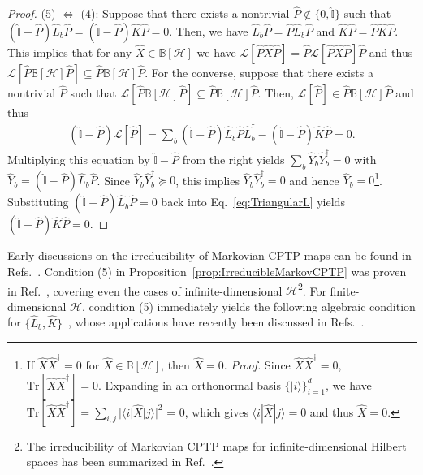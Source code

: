 \documentclass[preprint,pteplogo]{ptephy_v2}%
\numberwithin{equation}{section}
\theoremstyle{definition}
\newcommand{\mc}[1]{\mathcal{#1}}
\newcommand{\mr}[1]{\mathrm{#1}}
\newcommand{\mbb}[1]{\mathbb{#1}}
\newcommand{\Tr}{\mr{Tr}}
\begin{document}
\begin{proof}
(5) $\Leftrightarrow$ (4): 
Suppose that there exists a nontrivial $\hat{P} \notin \{ 0, \hat{\mathbb{I}} \}$ such that $(\hat{\mbb{I}}-\hat{P}) \hat{L}_b \hat{P} = (\hat{\mbb{I}}-\hat{P}) \hat{K} \hat{P} =0$.
Then, we have $\hat{L}_b \hat{P} = \hat{P} \hat{L}_b \hat{P}$ and $\hat{K} \hat{P} = \hat{P} \hat{K} \hat{P}$.
This implies that for any $\hat{X} \in \mbb{B}[\mc{H}]$ we have $\mc{L}[\hat{P} \hat{X} \hat{P}] = \hat{P} \mc{L}[\hat{P} \hat{X} \hat{P}] \hat{P}$ and thus $\mc{L}[\hat{P} \mbb{B}[\mc{H}] \hat{P}] \subseteq \hat{P} \mbb{B}[\mc{H}] \hat{P}$. 
For the converse, suppose that there exists a nontrivial $\hat{P}$ such that $\mc{L}[\hat{P} \mbb{B}[\mc{H}] \hat{P}] \subseteq \hat{P} \mbb{B}[\mc{H}] \hat{P}$. 
Then, $\mc{L}[\hat{P}] \in \hat{P} \mbb{B}[\mc{H}] \hat{P}$ and thus
\begin{align} \label{eq:TriangularL}
(\hat{\mbb{I}} -\hat{P}) \mc{L}[\hat{P}] = \sum_b (\hat{\mbb{I}}-\hat{P}) \hat{L}_b \hat{P} \hat{L}_b^\dagger -(\hat{\mbb{I}} -\hat{P}) \hat{K} \hat{P} = 0.
\end{align}
Multiplying this equation by $\hat{\mbb{I}} -\hat{P}$ from the right yields $\sum_b \hat{Y}_b \hat{Y}_b^\dagger = 0$ with $\hat{Y}_b = (\hat{\mbb{I}} -\hat{P}) \hat{L}_b \hat{P}$.
Since $\hat{Y}_b \hat{Y}_b^\dagger \succeq 0$, this implies $\hat{Y}_b \hat{Y}_b^\dagger = 0$ and hence $\hat{Y}_b = 0$\footnote{
If $\hat{X} \hat{X}^\dagger = 0$ for $\hat{X} \in \mbb{B}[\mc{H}]$, then $\hat{X}=0$. 
\textit{Proof.} Since $\hat{X} \hat{X}^\dagger = 0$, $\Tr [\hat{X} \hat{X}^\dagger] = 0$.
Expanding in an orthonormal basis $\{ |i\rangle \}_{i=1}^d$, we have $\Tr[\hat{X} \hat{X}^\dagger] = \sum_{i,j} |\langle i | \hat{X} | j \rangle|^2$ = 0, which gives $\langle i | \hat{X} | j \rangle = 0$ and thus $\hat{X}=0$.
}.
Substituting $(\hat{\mbb{I}}-\hat{P}) \hat{L}_b \hat{P} =0$ back into Eq.~\eqref{eq:TriangularL} yields $(\hat{\mbb{I}} -\hat{P}) \hat{K} \hat{P}=0$.
\end{proof}

Early discussions on the irreducibility of Markovian CPTP maps can be found in Refs.~\cite{davies1970quantum, evans1977irreducible, frigerio1977quantum, frigerio1978stationary, spohn1980kinetic}.
Condition (5) in Proposition~\ref{prop:IrreducibleMarkovCPTP} was proven in Ref.~\cite{fagnola2002subharmonic}, covering even the cases of infinite-dimensional $\mc{H}$\footnote{The irreducibility of Markovian CPTP maps for infinite-dimensional Hilbert spaces has been summarized in Ref.~\cite{fagnola2025irreducibility}.}.
For finite-dimensional $\mc{H}$, condition (5) immediately yields the following algebraic condition for $\{ \hat{L}_b, \hat{K} \}$~\cite{wolf2012quantum}, whose applications have recently been discussed in Refs.~\cite{yoshida2024uniqueness, zhang2024criteria}.
\end{document}
